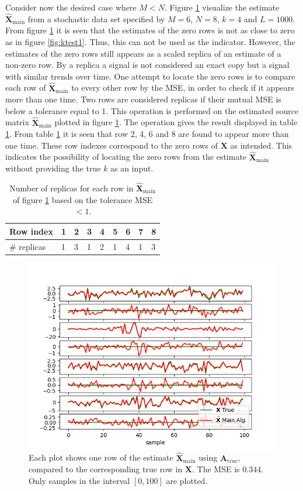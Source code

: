\noindent
Consider now the desired case where $M < N$.
Figure \ref{fig:ktest3} visualize the estimate $\hat{\mathbf{X}}_{\text{main}}$ from a stochastic data set specified by $M = 6$, $N = 8$, $k = 4$ and $L = 1000$.
From figure \ref{fig:ktest3} it is seen that the estimates of the zero rows is not as close to zero as in figure \ref{fig:ktest1}. 
Thus, this can not be used as the indicator. 
However, the estimates of the zero rows still appears as a scaled replica of an estimate of a non-zero row. 
By a replica a signal is not considered an exact copy but a signal with similar trends over time.
One attempt to locate the zero rows is to compare each row of $\hat{\mathbf{X}}_{\text{main}}$ to every other row by the MSE, in order to check if it appears more than one time.
Two rows are considered replicas if their mutual MSE is below a tolerance equal to 1. 
This operation is performed on the estimated source matrix $\hat{\mathbf{X}}_{\text{main}}$ plotted in figure \ref{fig:ktest3}.
The operation gives the result displayed in table \ref{tab:replica1}.
From table \ref{tab:replica1} it is seen that row 2, 4, 6 and 8 are found to appear more than one time. These row indexes correspond to the zero rows of $\mathbf{X}$ as intended. 
This indicates the possibility of locating the zero rows from the estimate $\hat{\mathbf{X}}_{\text{main}}$ without providing the true $k$ as an input.      
\begin{table}[H]
\center
\begin{tabular}{|l|l|l|l|l|l|l|l|l|}
\hline
Row index   & 1 & 2 & 3 & 4 & 5 & 6 & 7 & 8 \\ \hline
\# replicas & 1 & 3 & 1 & 2 & 1 & 4 & 1 & 3 \\ \hline
\end{tabular}
\caption{Number of replicas for each row in $\hat{\mathbf{X}}_{\text{main}}$ of figure \ref{fig:ktest3} based on the tolerance MSE $< 1$. }
\label{tab:replica1}
\end{table}
\noindent
\begin{figure}[H]
	\centering
	\includegraphics[scale=0.5]{figures/ch_estimate/k_test3.png}
	\caption{Each plot shows one row of the estimate $\hat{\mathbf{X}}_{\text{main}}$ using $\mathbf{A}_{\text{true}}$, compared to the corresponding true row in $\mathbf{X}$. The MSE is $0.344$. Only samples in the interval $[0,100]$ are plotted.}
	\label{fig:ktest3}
\end{figure}
